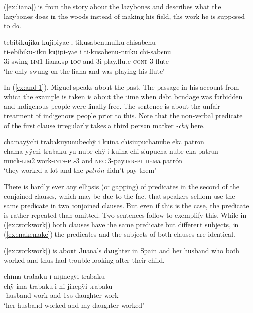 (\ref{ex:liana}) is from the story about the lazybones and describes what the lazybones does in the woods instead of making his field, the work he is supposed to do.

\ea\label{ex:liana}
\begingl
\glpreamble tebibikujiku kujipiyae i tikusabenunuiku chisabenu\\
\gla ti-ebibiku-jiku kujipi-yae i ti-kusabenu-nuiku chi-sabenu\\
\glb 3i-swing-\textsc{lim}1 liana.sp-\textsc{loc} and 3i-play.flute-\textsc{cont} 3-flute\\
\glft ‘he only swung on the liana and was playing his flute’
\endgl
\trailingcitation{[mox-n110920l.048-049]}
\xe

In (\ref{ex:and-1}), Miguel speaks about the past. The passage in his account from which the example is taken is about the time when debt bondage was forbidden and indigenous people were finally free. The sentence is about the unfair treatment of indigenous people prior to this. Note that the non-verbal predicate of the first clause irregularly takes a third person marker \textit{-chÿ} here.

\newpage
\ea\label{ex:and-1}
\begingl
\glpreamble chamayÿchi trabakuyunubechÿ i kuina chisiupuchanube eka patron\\
\gla chama-yÿchi trabaku-yu-nube-chÿ i kuina chi-siupucha-nube eka patrun\\
\glb much-\textsc{lim}2 work-\textsc{ints}-\textsc{pl}-3 and \textsc{neg} 3-pay.\textsc{irr}-\textsc{pl} \textsc{dem}a patrón\\
\glft ‘they worked a lot and the \textit{patrón} didn’t pay them’
\endgl
\trailingcitation{[mxx-p110825l.042]}
\xe


There is hardly ever any ellipsis (or gapping) of predicates in the second of the conjoined clauses, which may be due to the fact that speakers seldom use the same predicate in two conjoined clauses. But even if this is the case, the predicate is rather repeated than omitted. Two sentences follow to exemplify this. While in (\ref{ex:workwork}) both clauses have the same predicate but different subjects, in (\ref{ex:makemake}) the predicates and the subjects of both clauses are identical.

(\ref{ex:workwork}) is about Juana’s daughter in Spain and her husband who both worked and thus had trouble looking after their child.

\ea\label{ex:workwork}
\begingl
\glpreamble chima trabaku i nijinepÿi trabaku\\
\gla chÿ-ima trabaku i ni-jinepÿi trabaku\\
-husband work and 1\textsc{sg}-daughter work\\
\glft ‘her husband worked and my daughter worked’
\endgl
\trailingcitation{[jxx-p110923l-1.359]}
\xe

